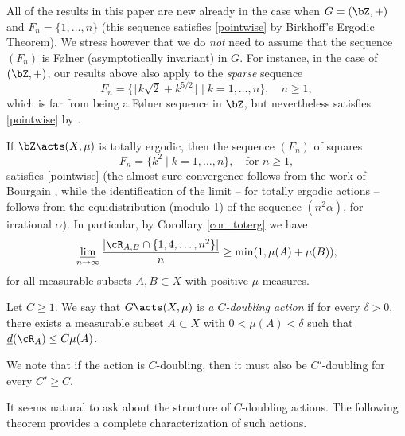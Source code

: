 \begin{example}
All of the results in this paper are new already in the case when $G = (\bZ,+)$ and $F_n = \{1,\ldots,n\}$ (this sequence satisfies \eqref{pointwise} by Birkhoff's Ergodic Theorem). We stress however that
we do \emph{not} need to assume that the sequence $(F_n)$ is F\o lner (asymptotically invariant) in $G$. For instance, in the case of $(\bZ,+)$, our results above also apply to the \emph{sparse} sequence
\[
F_n = \bigl\{ \lfloor k \sqrt{2} + k^{5/2} \rfloor \mid  k = 1,\ldots,n \bigr\}, \quad \textrm{$n \geq 1$},
\]
which is far from being a F\o lner sequence in $\bZ$, but nevertheless satisfies \eqref{pointwise} by \cite{BW}.
\end{example}

\begin{example}
If $\bZ \acts (X,\mu)$ is totally ergodic, then the sequence $(F_n)$ of squares
\[
F_n = \{ k^2 \mid k = 1,\ldots,n\}, \quad \textrm{for $n \geq 1$},
\]
satisfies \eqref{pointwise} (the almost sure convergence follows from the work of Bourgain \cite{Bo88}, while the identification of the limit -- for totally ergodic actions -- follows from the equidistribution (modulo 1) of the sequence $(n^2 \alpha)$, for irrational $\alpha$). In particular, by Corollary \ref{cor_toterg} we have
\[
\varliminf_{n \to \infty} \frac{|\cR_{A,B} \cap \{1,4,\ldots,n^2\}|}{n} \geq \min(1,\mu(A) + \mu(B)),
\]
for all measurable subsets $A, B \subset X$ with positive $\mu$-measures.
\end{example}


\begin{definition}
Let $C \geq 1$. We say that $G \acts (X,\mu)$ is \emph{a $C$\nobreakdash-doubling action} if for every $\delta > 0$, there
exists a measurable subset $A \subset X$ with $0 < \mu(A) < \delta$ such that $\underline{d}(\cR_A) \leq C\mu(A)$.
\end{definition}

\begin{remark}
We note that if the action is $C$\nobreakdash-doubling, then it must also be $C'$\nobreakdash-doubling for every $C' \geq C$.
\end{remark}

It seems natural to ask about the structure of $C$\nobreakdash-doubling actions. The following theorem provides a complete
characterization of such actions.

